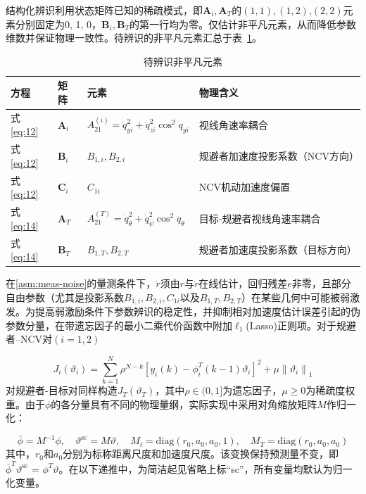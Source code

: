 结构化辨识利用状态矩阵已知的稀疏模式，即${{\mathbf{A}}_i},{{\mathbf{A}}_T}$的$(1,1),(1,2){\text{,}}(2,2)$元素分别固定为0, 1, 0，${{\mathbf{B}}_i},{{\mathbf{B}}_T}$的第一行均为零。仅估计非平凡元素，从而降低参数维数并保证物理一致性。待辨识的非平凡元素汇总于表~\ref{tab:nontrivial}。

\begin{table}[htbp]
\centering
\caption{待辨识非平凡元素}
\label{tab:nontrivial}
\small
\begin{tabularx}{\linewidth}{lXXX}
\toprule
方程 & 矩阵 & 元素 & 物理含义 \\
\midrule
式\eqref{eq:12} & ${{\mathbf{A}}_i}$ & $A_{21}^{(i)} = \dot q_{yi}^2 + \dot q_{zi}^2{\cos ^2}{q_{yi}}$ & 视线角速率耦合 \\
式\eqref{eq:12} & ${{\mathbf{B}}_i}$ & ${B_{1,i}},{B_{2,i}}$ & 规避者加速度投影系数（NCV方向） \\
式\eqref{eq:12} & ${{\mathbf{C}}_i}$ & ${C_{1i}}$ & NCV机动加速度偏置 \\
式\eqref{eq:14} & ${{\mathbf{A}}_T}$ & $A_{21}^{(T)} = \dot q_\theta ^2 + \dot q_\psi ^2{\cos ^2}{q_\theta }$ & 目标-规避者视线角速率耦合 \\
式\eqref{eq:14} & ${{\mathbf{B}}_T}$ & ${B_{1,T}},{B_{2,T}}$ & 规避者加速度投影系数（目标方向） \\
\bottomrule
\end{tabularx}
\end{table}
\FloatBarrier

在\cref{asm:meas-noise}的量测条件下，$\ddot r$须由$r$与$\dot r$在线估计，回归残差$e$非零，且部分自由参数（尤其是投影系数${B_{1,i}},{B_{2,i}},{C_{1i}}$以及${B_{1,T}},{B_{2,T}}$）在某些几何中可能被弱激发。为提高弱激励条件下参数辨识的稳定性，并抑制相对加速度估计误差引起的伪参数分量，在带遗忘因子的最小二乘代价函数中附加${\ell _1}$(Lasso)正则项。对于规避者–NCV对$(i = 1,2)$

\begin{equation}
\label{eq:55}
{J_i}({\vartheta _i}) = \sum\limits_{k = 1}^N {{\rho ^{N - k}}} {\left[ {{y_i}(k) - \phi _i^T(k - 1){\vartheta _i}} \right]^2} + \mu {\left\| {{\vartheta _i}} \right\|_1}
\end{equation}
对规避者-目标对同样构造${J_T}({\vartheta _T})$，其中$\rho  \in (0,1]$为遗忘因子，$\mu  \geqslant 0$为稀疏度权重。由于$\phi $的各分量具有不同的物理量纲，实际实现中采用对角缩放矩阵$M$作归一化：

\begin{equation}
\label{eq:56}
\bar{\phi} = {M^{ - 1}}\phi ,\quad {\vartheta ^{{\text{sc}}}} = M\vartheta ,\quad {M_i} = {\text{diag}}({r_0},{a_0},{a_0},1),\quad {M_T} = {\text{diag}}({r_0},{a_0},{a_0})
\end{equation}
其中，${r_0}$和${a_0}$分别为标称距离尺度和加速度尺度。该变换保持预测量不变，即$\bar{\phi}^{T}{\vartheta ^{{\text{sc}}}}{\text{ = }}{\phi ^T}\vartheta $。在以下递推中，为简洁起见省略上标“sc”，所有变量均默认为归一化变量。


